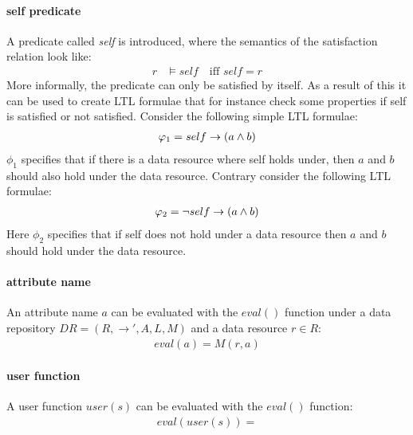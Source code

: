 \paragraph{self predicate}
A predicate called \emph{self} is introduced, where the semantics of the satisfaction relation look like:
\begin{align*}
    r &\models self \quad \text{iff } self = r
\end{align*}
More informally, the predicate can only be satisfied by itself. As a result of this it can be used to create LTL formulae that for instance check some properties if self is satisfied or not satisfied. Consider the following simple LTL formulae:
\begin{align*}
    \varphi_1 = self \rightarrow \left( a \land b \right)
\end{align*}
$\phi_1$ specifies that if there is a data resource where self holds under, then $a$ and $b$ should also hold under the data resource. Contrary consider the following LTL formulae:
\begin{align*}
    \varphi_2 = \neg self \rightarrow \left( a \land b \right)
\end{align*}
Here $\phi_2$ specifies that if self does not hold under a data resource then $a$ and $b$ should hold under the data resource.

\paragraph{attribute name}
\begin{lemma}
An attribute name $a$ can be evaluated with the $eval()$ function under a data repository $DR=\left(R, \longrightarrow', A, L, M \right)$ and a data resource $r \in R$:
\begin{align*}
    eval(a) = M(r, a) 
\end{align*}
\end{lemma}

\paragraph{user function}
\begin{lemma}
A user function $user(s)$ can be evaluated with the $eval()$ function:
\begin{align*}
    eval(user(s)) = 
\end{align*}
\end{lemma}


